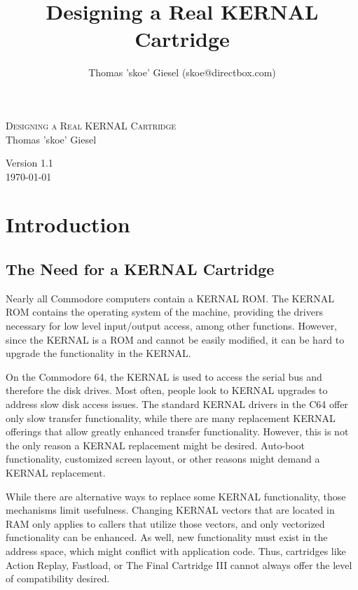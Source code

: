 \documentclass[a4paper,oneside]{memoir}
\title{Designing a Real KERNAL Cartridge}
\author{
Thomas 'skoe' Giesel
(skoe@directbox.com)
}
\begin{document}
\hsize

\pagestyle{empty}
\begin{center}

\vspace*{5cm}
\textsc{\huge Designing a Real KERNAL Cartridge}\\[2cm]
{\large Thomas 'skoe' Giesel}

\vfill

{\large Version 1.1 \\[0.5cm] \today}

\end{center}

\clearpage

\tableofcontents

\chapter{Introduction}

\section{The Need for a KERNAL Cartridge}

Nearly all Commodore computers contain a KERNAL ROM. The KERNAL ROM
contains the operating system of the machine, providing the drivers
necessary for low level input/output access, among other functions.
However, since the KERNAL is a ROM and cannot be easily modified, it
can be hard to upgrade the functionality in the KERNAL.

On the Commodore 64, the KERNAL is used to access the serial bus and
therefore the disk drives. Most often, people look to KERNAL
upgrades to address slow disk access issues. The standard KERNAL
drivers in the C64 offer only slow transfer functionality, while
there are many replacement KERNAL offerings that allow greatly
enhanced transfer functionality. However, this is not the only
reason a KERNAL replacement might be desired. Auto-boot
functionality, customized screen layout, or other reasons might
demand a KERNAL replacement.

While there are alternative ways to
replace some KERNAL functionality, those mechanisms limit
usefulness. Changing KERNAL vectors that are located in RAM only
applies to callers that utilize those vectors, and only vectorized
functionality can be enhanced. As well, new functionality must
exist in the address space, which might conflict with application
code. Thus, cartridges like Action Replay, Fastload, or The Final
Cartridge III cannot always offer the level of compatibility
desired.
\end{document}
